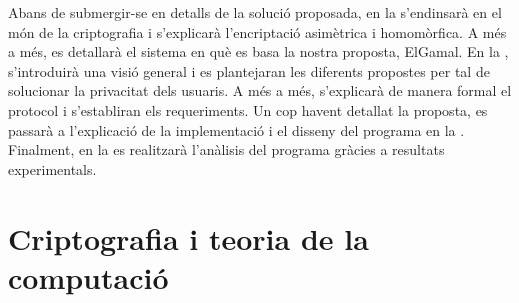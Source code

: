 \documentclass{article}
\begin{document}
Abans de submergir-se en detalls de la solució proposada, en la  s'endinsarà en el món de la criptografia i s'explicarà l'encriptació asimètrica i homomòrfica. A més a més, es detallarà el sistema en què es basa la nostra proposta, ElGamal. En la ,  s'introduirà una visió general i es plantejaran les diferents propostes per tal de solucionar la privacitat dels usuaris. A més a més, s'explicarà de manera formal el protocol i s'establiran els requeriments. Un cop havent detallat la proposta, es passarà a l'explicació de la implementació i el disseny del programa en la . Finalment, en la  es realitzarà l'anàlisis del programa gràcies a resultats experimentals.
\part{Criptografia i teoria de la computació}\label{part:criptografia}
\end{document}
